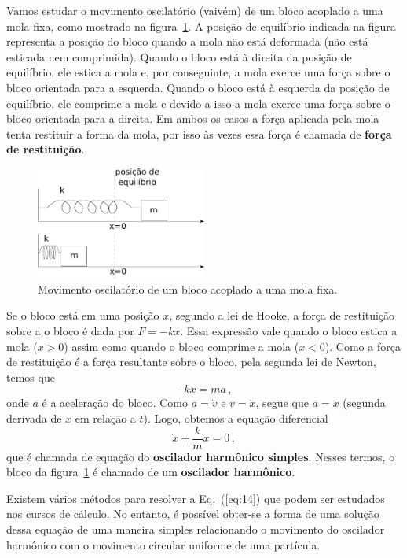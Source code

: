 \documentclass[12pt,a4paper]{article}
\theoremstyle{definition}
\begin{document}
Vamos estudar o movimento oscilatório (vaivém) de um bloco acoplado a
uma mola fixa, como mostrado na figura~\ref{fig:massamola}. A posição
de equilíbrio indicada na figura representa a posição do bloco quando
a mola não está deformada (não está esticada nem comprimida). Quando o
bloco está à direita da posição de equilíbrio, ele estica a mola e,
por conseguinte, a mola exerce uma força sobre o bloco orientada para
a esquerda. Quando o bloco está à esquerda da posição de equilíbrio,
ele comprime a mola e devido a isso a mola exerce uma força sobre o
bloco orientada para a direita. Em ambos os casos a força aplicada
pela mola tenta restituir a forma da mola, por isso às vezes essa
força é chamada de \textbf{força de restituição}.
\begin{figure}[t]
  \centering
  \includegraphics[width=0.5\textwidth,keepaspectratio]{aux/massamola.pdf}
  \caption{Movimento oscilatório de um bloco acoplado a uma mola
    fixa.}
  \label{fig:massamola}
\end{figure}

Se o bloco está em uma posição $x$, segundo a lei de Hooke, a força de
restituição sobre a o bloco é dada por $F=-kx$. Essa expressão vale
quando o bloco estica a mola ($x>0$) assim como quando o bloco
comprime a mola ($x<0$). Como a força de restituição é a força
resultante sobre o bloco, pela segunda lei de Newton, temos que
$$-kx=ma\,,$$
onde $a$ é a aceleração do bloco. Como $a=\dot v$ e $v=\dot x$, segue
que $a=\ddot x$ (segunda derivada de $x$ em relação a $t$). Logo,
obtemos a equação diferencial
\begin{equation}
  \label{eq:14}
  \ddot x+\frac{k}{m}x=0\,,
\end{equation}
que é chamada de equação do \textbf{oscilador harmônico
  simples}. Nesses termos, o bloco da figura~\ref{fig:massamola} é
chamado de um \textbf{oscilador harmônico}.

Existem vários métodos para resolver a Eq.~(\ref{eq:14}) que podem ser
estudados nos cursos de cálculo. No entanto, é possível obter-se a
forma de uma solução dessa equação de uma maneira simples relacionando
o movimento do oscilador harmônico com o movimento circular uniforme
de uma partícula.
\end{document}
